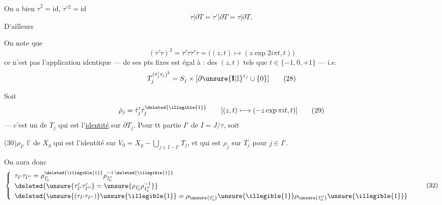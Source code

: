 
 On a bien $\dot\tau^2=\mathrm{id}$, $\dot\tau'{}^2=\mathrm{id}$
\[
\dot\tau|\partial T=\dot\tau'|\partial T=\tau|\partial T,
\]
D'ailleurs

On note que
\[
(\dot\tau'\dot\tau)^2
=\dot\tau'\dot\tau\dot\tau'\dot\tau
=\bigl((z,t)\longmapsto(z\exp 2i\pi t,t)\bigr)
\]
ce n'est pas l'application identique ---  de ses pts fixes est égal à : 
 des $(z,t)$ tels que $t\in\{-1,0,+1\}$ --- i.e.
\[
T_j^{(\dot\tau'_j\dot\tau_j)^2}
=S_j\times[\partial\unsure{\mathbf I|\mathbb I}^{\varepsilon_j}\cup\{0\}]
\tag{28}
\]



Soit 
\[
\dot\rho_j=\dot\tau'_j\dot\tau_j^{\deleted{\illegible{1}}}
\qquad [(z,t)\longmapsto(-z\exp\pi it,t)]
\tag{29}
\]
--- c'est un  de $T_j$ qui est l'\uline{identité} sur $\partial T_j$.
 Pour tt partie $I'$ de $I=J/\tau$, soit

(30)\quad $\rho_{I'}$ l' de $X_g$ qui est l'identité sur
$V_0=X_g-\bigcup_{j\in I-I'}T_j$,
et qui est $\rho_j$ sur $T_j$ pour $j\in I'$.



On aura donc
\[
\left\{
\begin{array}{l}
\tau_{I'}\tau_{I''}
=\rho_{I'_0}^{\deleted{\illegible{1}}}\rho_{I''_0}^{-1\,\deleted{\illegible{1}}}
\\[3pt]
\deleted{\unsure{\tau'_{I'}\tau'_{I''}}=\unsure{\rho_{I'_0}\rho_{I''_0}^{-1}}}
\\[3pt]
\deleted{\unsure{(\tau_{I'}\tau_{I''})}\unsure{\illegible{1}}=\rho_{\unsure{I'_0}}\unsure{\illegible{1}}\rho_{\unsure{I''_0}}\unsure{\illegible{1}}}
\end{array}
\right.
\tag{32}
\]

